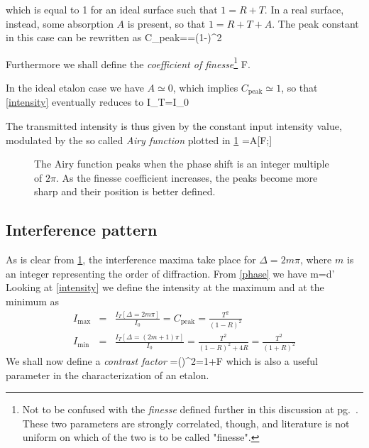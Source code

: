 which is equal to 1 for an ideal surface such that $1=R+T$. In a real surface, instead, some absorption $A$ is present, so that $1=R+T+A$. The peak constant in this case can be rewritten as
\mate
C_{\mbox{peak}}==\left(1-\right)^2
\atem 

Furthermore we shall define the \textit{coefficient of finesse}\footnote{Not to be confused with the \textit{finesse} defined further in this discussion at pg.\ \pageref{finesse}. These two parameters are strongly correlated, though, and literature is not uniform on which of the two is to be called "finesse".}
\mate
F\equiv{}.
\atem

In the ideal etalon case we have $A\simeq0$, which implies $C_{\mbox{peak}}\simeq1$,  so that \cref{intensity} eventually reduces to
\mate
I_T=I_0\ 
\atem

The transmitted intensity is thus given by the constant input intensity value, modulated by the so called \textit{Airy function} plotted in \cref{Airyplot}
\mate
{}=\equiv A[F;\Delta]
\atem

\begin{figure}[htb]\centering

\caption{The Airy function peaks when the phase shift is an integer multiple of $2\pi$. As the finesse coefficient increases, the peaks become more sharp and their position is better defined.}
\label{Airyplot}
\end{figure}
\subsection{Interference pattern}
As is clear from \cref{Airyplot}, the interference maxima take place for $\Delta=2m\pi$, where $m$ is an integer representing the order of diffraction.
From \cref{phase} we have
\mate
m=d\cos\theta'
\label{ordine}
\atem
Looking at \cref{intensity} we define the intensity at the maximum and at the minimum as
\begin{eqnarray}
I_{\mbox{max}}&=&\frac{I_T[\Delta=2m\pi]}{I_{0}}=C_{\mbox{peak}}=\frac{T^2}{(1-R)^2}\\
I_{\mbox{min}}&=&\frac{I_T[\Delta=(2m+1)\pi]}{I_{0}}=\frac{T^2}{(1-R)^2+4R}=\frac{T^2}{(1+R)^2}
\end{eqnarray}
We shall now define a \textit{contrast factor}
\mate
{}\equiv{}=\left(\right)^2=1+F
\atem
which is also a useful parameter in the characterization of an etalon.


